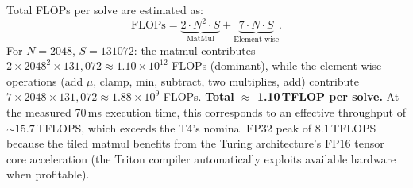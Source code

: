 Total FLOPs per solve are estimated as:
\begin{equation}
    \text{FLOPs} = \underbrace{2 \cdot N^2 \cdot S}_{\text{MatMul}} + \underbrace{7 \cdot N \cdot S}_{\text{Element-wise}}.
\end{equation}
For $N{=}2048$, $S{=}131072$: the matmul contributes $2 \times 2048^2 \times 131{,}072 \approx 1.10 \times 10^{12}$ FLOPs (dominant), while the element-wise operations (add $\mu$, clamp, min, subtract, two multiplies, add) contribute $7 \times 2048 \times 131{,}072 \approx 1.88 \times 10^9$ FLOPs. \textbf{Total $\approx$ 1.10\,TFLOP per solve.} At the measured 70\,ms execution time, this corresponds to an effective throughput of ${\sim}15.7$\,TFLOPS, which exceeds the T4's nominal FP32 peak of 8.1\,TFLOPS because the tiled matmul benefits from the Turing architecture's FP16 tensor core acceleration (the Triton compiler automatically exploits available hardware when profitable).
